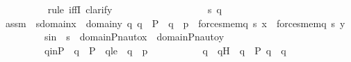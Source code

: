 \begin{isabellebody}
\ \ \ \ \ \ \ \ \isamarkupfalse%
\ {\isacharparenleft}{\kern0pt}rule\ iffI{\isacharsemicolon}{\kern0pt}\ clarify{\isacharparenright}{\kern0pt}\isanewline
\ \ \ \ \ \ \isamarkupfalse%
\ {\isacharminus}{\kern0pt}\ \isanewline
\ \ \ \ \ \ \ \ \isamarkupfalse%
\ s{\isacharprime}{\kern0pt}\ q{\isacharprime}{\kern0pt}\ \ \isamarkupfalse%
\ assm{\isacharcolon}{\kern0pt}\ \ {\isachardoublequoteopen}{\isasymforall}s{\isasymin}domain{\isacharparenleft}{\kern0pt}x{\isacharparenright}{\kern0pt}\ {\isasymunion}\ domain{\isacharparenleft}{\kern0pt}y{\isacharparenright}{\kern0pt}{\isachardot}{\kern0pt}\ {\isasymforall}q{\isachardot}{\kern0pt}\ q\ {\isasymin}\ P\ {\isasymand}\ q\ {\isasympreceq}\ p\ {\isasymlongrightarrow}\ forces{\isacharunderscore}{\kern0pt}mem{\isacharparenleft}{\kern0pt}q{\isacharcomma}{\kern0pt}\ s{\isacharcomma}{\kern0pt}\ x{\isacharparenright}{\kern0pt}\ {\isasymlongleftrightarrow}\ forces{\isacharunderscore}{\kern0pt}mem{\isacharparenleft}{\kern0pt}q{\isacharcomma}{\kern0pt}\ s{\isacharcomma}{\kern0pt}\ y{\isacharparenright}{\kern0pt}{\isachardoublequoteclose}\ \isanewline
\ \ \ \ \ \ \ \ \ s{\isacharprime}{\kern0pt}in\ {\isacharcolon}{\kern0pt}\ {\isachardoublequoteopen}s{\isacharprime}{\kern0pt}\ {\isasymin}\ domain{\isacharparenleft}{\kern0pt}Pn{\isacharunderscore}{\kern0pt}auto{\isacharparenleft}{\kern0pt}{\isasympi}{\isacharparenright}{\kern0pt}{\isacharbackquote}{\kern0pt}x{\isacharparenright}{\kern0pt}\ {\isasymunion}\ domain{\isacharparenleft}{\kern0pt}Pn{\isacharunderscore}{\kern0pt}auto{\isacharparenleft}{\kern0pt}{\isasympi}{\isacharparenright}{\kern0pt}{\isacharbackquote}{\kern0pt}y{\isacharparenright}{\kern0pt}{\isachardoublequoteclose}\ \isanewline
\ \ \ \ \ \ \ \ \ q{\isacharprime}{\kern0pt}inP\ {\isacharcolon}{\kern0pt}\ {\isachardoublequoteopen}q{\isacharprime}{\kern0pt}\ {\isasymin}\ P{\isachardoublequoteclose}\ \ q{\isacharprime}{\kern0pt}le\ {\isacharcolon}{\kern0pt}\ {\isachardoublequoteopen}q{\isacharprime}{\kern0pt}\ {\isasympreceq}\ {\isasympi}{\isacharbackquote}{\kern0pt}p{\isachardoublequoteclose}\ \isanewline
\isanewline
\ \ \ \ \ \ \ \ \isamarkupfalse%
\ q\ \ qH\ {\isacharcolon}{\kern0pt}\ {\isachardoublequoteopen}q\ {\isasymin}\ P{\isachardoublequoteclose}\ {\isachardoublequoteopen}q{\isacharprime}{\kern0pt}\ {\isacharequal}{\kern0pt}\ {\isasympi}{\isacharbackquote}{\kern0pt}q{\isachardoublequoteclose}\ \isanewline
\ \ \ \ \ \ \ \ \ \ \isamarkupfalse%

\end{isabellebody}
